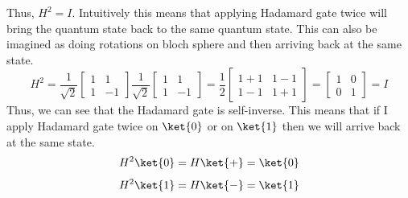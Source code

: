 \documentclass[12pt, oneside]{book}
\theoremstyle{definition}
\theoremstyle{definition}
\theoremstyle{remark}
\begin{document}
Thus, $H^2=I$. Intuitively this means that applying Hadamard gate twice will bring the quantum state back to the same quantum state. This can also be imagined 
as doing rotations on bloch sphere and then arriving back at the same state.
\[ H^2=\dfrac{1}{\sqrt{2}}\begin{bmatrix}
    1 & 1 \\
    1 & -1
\end{bmatrix}\dfrac{1}{\sqrt{2}}\begin{bmatrix}
    1 & 1 \\
    1 & -1
\end{bmatrix}=\dfrac{1}{2}\begin{bmatrix}
    1+1 & 1-1 \\
    1-1 & 1+1
\end{bmatrix}=\begin{bmatrix}
    1 & 0 \\
    0 & 1
\end{bmatrix}=I
\]
Thus, we can see that the Hadamard gate is self-inverse.
This means that if I apply Hadamard gate twice on $\ket{0}$ or on $\ket{1}$ then we will arrive back
at the same state. 
\[ H^2\ket{0}=H\ket{+}=\ket{0} \]
\[ H^2\ket{1}=H\ket{-}=\ket{1} \]
\end{document}
